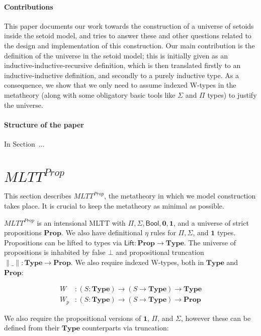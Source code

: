 \documentclass{easychair}
\newcommand{\mType}{\mathbf{Type}}
\newcommand{\mProp}{\mathbf{Prop}}
\begin{document}
\paragraph{Contributions}

This paper documents our work towards the construction of a universe of setoids
inside the setoid model, and tries to answer these and other questions related
to the design and implementation of this construction. Our main contribution is
the definition of the universe in the setoid model; this is initially given as
an inductive-inductive-recursive definition, which is then translated firstly to
an inductive-inductive definition, and secondly to a purely inductive type. As a
consequence, we show that we only need to assume indexed W-types in the
metatheory (along with some obligatory basic tools like $\Sigma$ and $\Pi$
types) to justify the universe.

\paragraph{Structure of the paper}

In Section~\label{sec:metatheory}...

\section{$MLTT^{Prop}$}\label{metatheory}

This section describes $MLTT^{Prop}$, the metatheory in which we model
construction takes place. It is crucial to keep the metatheory as minimal as
possible.

$MLTT^{Prop}$ is an intensional MLTT with $\Pi, \Sigma, \textsf{Bool},
\mathbf{0}, \mathbf{1}$, and a universe of strict propositions $\mProp$. We also
have definitional $\eta$ rules for $\Pi, \Sigma$, and $\mathbf{1}$
types. Propositions can be lifted to types via $\textsf{Lift} : \mProp \to
\mType$. The universe of propositions is inhabited by false $\bot$ and
propositional truncation $\|\_\| : \mType \to \mProp$. We also require indexed
W-types, both in $\mType$ and $\mProp$:

\begin{align*}
  W & : (S : \mType) \to (S \to \mType) \to \mType \\
  W_p & : (S : \mType) \to (S \to \mType) \to \mProp
\end{align*}

We also require the propositional versions of $\mathbf{1}$, $\Pi$, and $\Sigma$,
however these can be defined from their $\mType$ counterparts via truncation:
\end{document}
